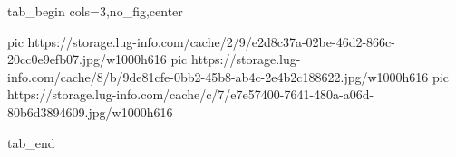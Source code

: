  
 
 
 
 


\ifcmt
  tab_begin cols=3,no_fig,center

     pic https://storage.lug-info.com/cache/2/9/e2d8c37a-02be-46d2-866c-20cc0e9efb07.jpg/w1000h616%
		 pic https://storage.lug-info.com/cache/8/b/9de81cfe-0bb2-45b8-ab4c-2e4b2c188622.jpg/w1000h616%
		 pic https://storage.lug-info.com/cache/c/7/e7e57400-7641-480a-a06d-80b6d3894609.jpg/w1000h616%

  tab_end
\fi
